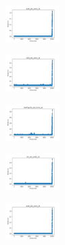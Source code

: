 \begin{figure}[H]
\begin{subfigure}
    \end{subfigure}
    \hfill
    \begin{subfigure}
        \centering
        \includegraphics[width=0.234\textwidth]{img/HS-LS/ecoli_set_const_10_589741062_time.png}
    \end{subfigure}
    \hfill
    \begin{subfigure}
        \centering
        \includegraphics[width=0.234\textwidth]{img/HS-LS/rand_set_const_10_589741062_time.png}
    \end{subfigure}
    \hfill
    \begin{subfigure}
        \centering
        \includegraphics[width=0.234\textwidth]{img/HS-LS/newthyroid_set_const_10_589741062_time.png}
    \end{subfigure}
    \hfill
    \begin{subfigure}
        \centering
        \includegraphics[width=0.234\textwidth]{img/HS-LS/iris_set_const_10_277451237_time.png}
    \end{subfigure}
    \hfill
    \begin{subfigure}
        \centering
        \includegraphics[width=0.234\textwidth]{img/HS-LS/ecoli_set_const_10_277451237_time.png}
    \end{subfigure}
    \hfill

\end{figure}
